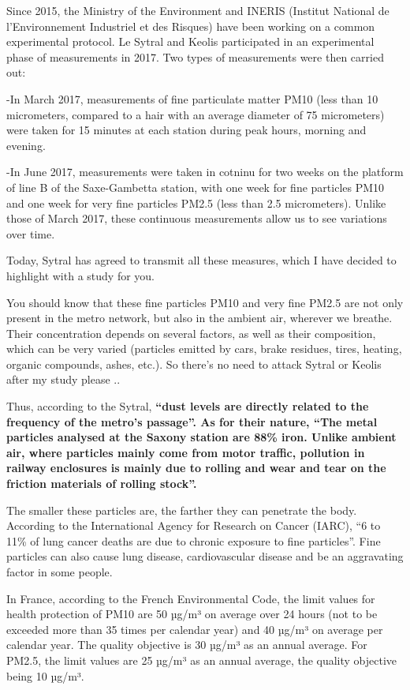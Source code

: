 \documentclass[11pt]{article}
\begin{document}
Since 2015, the Ministry of the Environment and INERIS (Institut
National de l'Environnement Industriel et des Risques) have been working
on a common experimental protocol. Le Sytral and Keolis participated in
an experimental phase of measurements in 2017. Two types of measurements
were then carried out:

-In March 2017, measurements of fine particulate matter PM10 (less than
10 micrometers, compared to a hair with an average diameter of 75
micrometers) were taken for 15 minutes at each station during peak
hours, morning and evening.

-In June 2017, measurements were taken in cotninu for two weeks on the
platform of line B of the Saxe-Gambetta station, with one week for fine
particles PM10 and one week for very fine particles PM2.5 (less than 2.5
micrometers). Unlike those of March 2017, these continuous measurements
allow us to see variations over time.

Today, Sytral has agreed to transmit all these measures, which I have
decided to highlight with a study for you.

You should know that these fine particles PM10 and very fine PM2.5 are
not only present in the metro network, but also in the ambient air,
wherever we breathe. Their concentration depends on several factors, as
well as their composition, which can be very varied (particles emitted
by cars, brake residues, tires, heating, organic compounds, ashes,
etc.). So there's no need to attack Sytral or Keolis after my study
please ..

Thus, according to the Sytral, \textbf{``dust levels are directly
related to the frequency of the metro's passage''. As for their nature,
``The metal particles analysed at the Saxony station are 88\% iron.
Unlike ambient air, where particles mainly come from motor traffic,
pollution in railway enclosures is mainly due to rolling and wear and
tear on the friction materials of rolling stock''.}

The smaller these particles are, the farther they can penetrate the
body. According to the International Agency for Research on Cancer
(IARC), ``6 to 11\% of lung cancer deaths are due to chronic exposure to
fine particles''. Fine particles can also cause lung disease,
cardiovascular disease and be an aggravating factor in some people.

In France, according to the French Environmental Code, the limit values
for health protection of PM10 are 50 µg/m³ on average over 24 hours (not
to be exceeded more than 35 times per calendar year) and 40 µg/m³ on
average per calendar year. The quality objective is 30 µg/m³ as an
annual average. For PM2.5, the limit values are 25 µg/m³ as an annual
average, the quality objective being 10 µg/m³.
\end{document}
